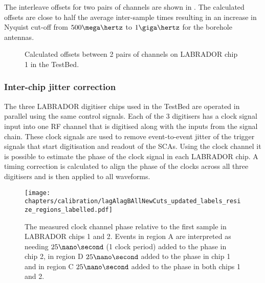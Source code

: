 The interleave offsets for two pairs of channels are shown in . The calculated offsets are close to half the average inter-sample times resulting in an increase in Nyquist cut-off from $500 \mega\hertz$ to $1\giga\hertz$ for the borehole antennas.

\begin{figure}[htpb]
  \hfill
  \caption{Calculated offsets between 2 pairs of channels on LABRADOR chip 1 in the TestBed.}
  \label{fig:calibration:LABRADOR-Digitiser-Chip:Interleave}
\end{figure}



\subsubsection{Inter-chip jitter correction}
\label{sec:calibration:LABRADOR-Digitiser-Chip:Inter-chip-jitter-correction}

The three LABRADOR digitiser chips used in the TestBed are operated in parallel using the same control signals. Each of the 3 digitisers has a clock signal input into one RF channel that is digitised along with the inputs from the signal chain. These clock signals are used to remove event-to-event jitter of the trigger signals that start digitisation and readout of the SCAs. Using the clock channel it is possible to estimate the phase of the clock signal in each LABRADOR chip. A timing correction is calculated to align the phase of the clocks across all three digitisers and is then applied to all waveforms.

\begin{figure}[htpb]
  \texttt{[image: chapters/calibration/lagAlagBAllNewCuts\_updated\_labels\_resize\_regions\_labelled.pdf]}
  \caption{The measured clock channel phase relative to the first sample in LABRADOR chips 1 and 2. Events in region A are interpreted as needing $25 \nano \second$ (1 clock period) added to the phase in chip 2, in region D $25 \nano \second$ added to the phase in chip 1 and in region C $25 \nano \second$ added to the phase in both chips 1 and 2.}
  \label{fig:calibration:LABRADOR-Digitiser-Chip:Swiss-flag}
\end{figure}

